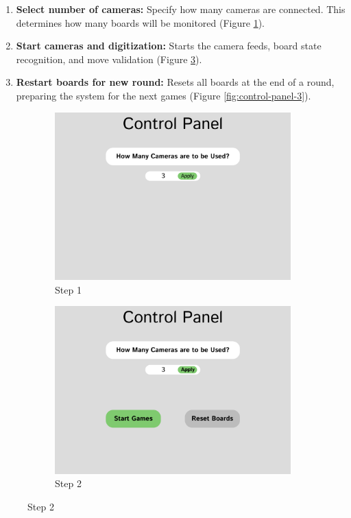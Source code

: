 \begin{enumerate}
\item \textbf{Select number of cameras:} Specify how many cameras are connected. This determines how many boards will be monitored  (Figure \ref{fig:control-panel-1}).
\item \textbf{Start cameras and digitization:} Starts the camera feeds, board state recognition, and move validation (Figure \ref{fig:control-panel-2}).
\item \textbf{Restart boards for new round:} Resets all boards at the end of a round, preparing the system for the next games (Figure \ref{fig:control-panel-3}).
\end{enumerate}

\newpage

\begin{figure}[h!]
    \centering
    \begin{subfigure}[h!]{0.40\linewidth}
        \centering
        \includegraphics[width=\linewidth]{figures/methods/wireframes/control-panel-1.png}
        \caption{Step 1}
        \label{fig:control-panel-1}
    \end{subfigure}
    \hfill
    \begin{subfigure}[h!]{0.40\linewidth}
        \centering
        \includegraphics[width=\linewidth]{figures/methods/wireframes/control-panel-2.png}
        \caption{Step 2}
        \label{fig:control-panel-2}
    \end{subfigure}


\end{figure}
